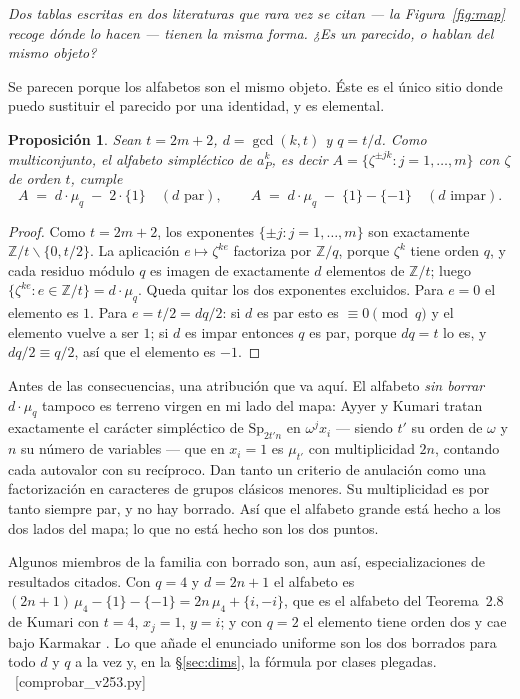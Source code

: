 \documentclass[11pt,a4paper]{article}
\newtheorem{proposition}[theorem]{Proposición}
\newcommand{\Sp}{\mathrm{Sp}}
\newcommand{\ver}[1]{\unskip\penalty0\ \textcolor{azul}{\small\textsf{[#1]}}}
\begin{document}
\noindent\emph{Dos tablas escritas en dos literaturas que rara vez se citan --- la Figura~\ref{fig:map} recoge dónde lo hacen --- tienen la misma forma. ¿Es un parecido, o hablan del mismo objeto?}

Se parecen porque los alfabetos son el mismo objeto. Éste es el único sitio donde puedo sustituir el
parecido por una identidad, y es elemental.

\begin{proposition}\label{prop:alph}
Sean $t=2m+2$, $d=\gcd(k,t)$ y $q=t/d$. Como multiconjunto, el alfabeto simpléctico de $a_P^k$, es
decir $A=\{\zeta^{\pm jk}: j=1,\dots,m\}$ con $\zeta$ de orden $t$, cumple
\[
A \;=\; d\cdot\mu_q \;-\; 2\cdot\{1\} \quad (d \text{ par}),
\qquad
A \;=\; d\cdot\mu_q \;-\;\{1\}-\{-1\} \quad (d \text{ impar}).
\]
\end{proposition}

\begin{proof}
Como $t=2m+2$, los exponentes $\{\pm j : j=1,\dots,m\}$ son exactamente
$\mathbb{Z}/t\smallsetminus\{0,t/2\}$. La aplicación $e\mapsto\zeta^{ke}$ factoriza por
$\mathbb{Z}/q$, porque $\zeta^k$ tiene orden $q$, y cada residuo módulo $q$ es imagen de exactamente
$d$ elementos de $\mathbb{Z}/t$; luego $\{\zeta^{ke}: e\in\mathbb{Z}/t\}=d\cdot\mu_q$. Queda quitar
los dos exponentes excluidos. Para $e=0$ el elemento es $1$. Para $e=t/2=dq/2$: si $d$ es par esto es
$\equiv 0 \pmod q$ y el elemento vuelve a ser $1$; si $d$ es impar entonces $q$ es par, porque
$dq=t$ lo es, y $dq/2\equiv q/2$, así que el elemento es $-1$.
\end{proof}

\noindent Antes de las consecuencias, una atribución que va aquí. El alfabeto \emph{sin borrar}
$d\cdot\mu_q$ tampoco es terreno virgen en mi lado del mapa: Ayyer y Kumari \cite{AK22} tratan
exactamente el carácter simpléctico de $\Sp_{2t'n}$ en $\omega^j x_i$ --- siendo $t'$ su orden de
$\omega$ y $n$ su número de variables --- que en $x_i=1$ es $\mu_{t'}$ con multiplicidad $2n$,
contando cada autovalor con su recíproco. Dan tanto un criterio de anulación como una factorización
en caracteres de grupos clásicos menores. Su multiplicidad es por tanto siempre par, y no hay
borrado. Así que el
alfabeto grande está hecho a los dos lados del mapa; lo que no está hecho son los dos puntos.

\noindent Algunos miembros de la familia con borrado son, aun así, especializaciones de resultados
citados. Con $q=4$ y $d=2n+1$ el alfabeto es $(2n+1)\,\mu_4-\{1\}-\{-1\}=2n\,\mu_4+\{i,-i\}$, que es
el alfabeto del Teorema~2.8 de Kumari \cite{Kum24} con $t=4$, $x_j=1$, $y=i$; y con $q=2$ el
elemento tiene orden dos y cae bajo Karmakar \cite{Kar24}. Lo que añade el enunciado uniforme son
los dos borrados para todo $d$ y $q$ a la vez y, en la \S\ref{sec:dims}, la fórmula por clases
plegadas. \ver{comprobar\_v253.py}
\end{document}
